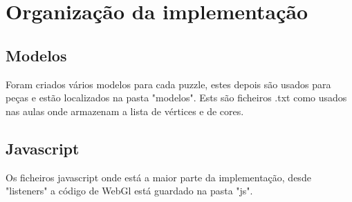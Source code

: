 \documentclass[pdftex,12pt,a4paper]{report}
\begin{document}
\section{Organização da implementação}

\subsection{Modelos}

Foram criados vários modelos para cada puzzle, estes depois são usados para peças e estão localizados na pasta "modelos". Ests são ficheiros .txt como usados nas aulas onde armazenam a lista de vértices e de cores. 

\subsection{Javascript}

Os ficheiros javascript onde está a maior parte da implementação, desde "listeners" a código de WebGl está guardado na pasta "js".
\end{document}
